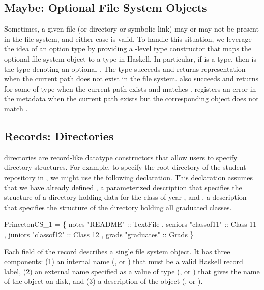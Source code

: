 \subsection{Maybe: Optional File System Objects}
\label{sec:maybe}
Sometimes, a given file (or directory or symbolic link) may or may not
be present in the file system, and either case is valid.
To handle this situation, we leverage the idea of an option type by
providing a \forest{}-level  type constructor that maps the
optional file system object to a  type in Haskell. In particular,
if  is a \forest{} type, then  is the
\forest{} type denoting an optional .  The type
 succeeds and returns representation  when the
current path does not exist in the file system.   also
succeeds and returns  for some  of type  
when the current path exists and matches .  
registers an error in the metadata when the current path exists but
the corresponding object does not match . 


\subsection{Records: Directories}
\label{sec:directories}
\forest{} directories are record-like datatype constructors that allow
users to specify directory structures. For example, to specify the root directory
of the student repository in , we might use
the following declaration.  This declaration assumes that we have already
defined , a parameterized description that specifies
the structure of a directory holding data for the class of year ,
and , a description that specifies the structure of the
directory holding all graduated classes.   
\begin{code}
 PrincetonCS_1 = 
  \{ notes    "README"    :: TextFile
  , seniors  "classof11" :: Class 11
  , juniors  "classof12" :: Class 12
  , grads    "graduates" :: Grads \}
\end{code}
Each field of the record describes a single file system object.  It has three components:  
(1) an internal name (\eg{},  or ) that
must be a valid Haskell record label, 
(2) an external name specified as a value of type 
(\eg{},  or  ) that gives the name of the
object on disk, and 
(3) a \forest{} description of the object (\eg{},  or ).

